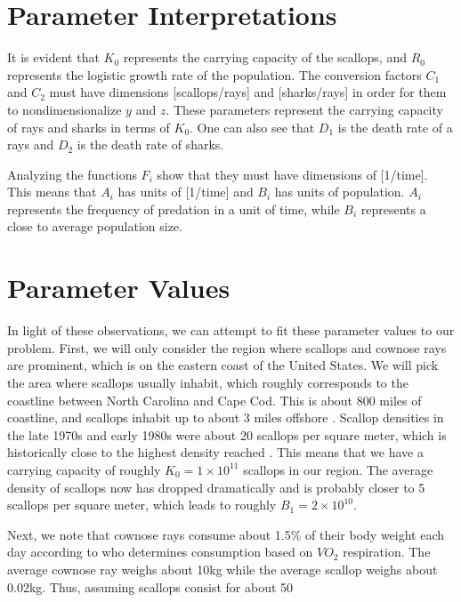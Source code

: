 \documentclass{article}
\begin{document}
\section{Parameter Interpretations}

It is evident that $K_0$ represents the carrying capacity of the scallops, and $R_0$ represents the logistic growth rate of the population. The conversion factors $C_1$ and $C_2$ must have dimensions [scallops/rays] and [sharks/rays] in order for them to nondimensionalize $y$ and $z$. These parameters represent the carrying capacity of rays and sharks in terms of $K_0$. One can also see that $D_1$ is the death rate of a rays and $D_2$ is the death rate of sharks. 

Analyzing the functions $F_i$ show that they must have dimensions of [1/time]. This means that $A_i$ has units of [1/time] and $B_i$ has units of population. $A_i$ represents the frequency of predation in a unit of time, while $B_i$ represents a close to average population size. 

\section{Parameter Values}

In light of these observations, we can attempt to fit these parameter values to our problem. First, we will only consider the region where scallops and cownose rays are prominent, which is on the eastern coast of the United States. We will pick the area where scallops usually inhabit, which roughly corresponds to the coastline between North Carolina and Cape Cod. This is about 800 miles of coastline, and scallops inhabit up to about 3 miles offshore \cite{Fay(1983)}. Scallop densities in the late 1970s and early 1980s were about 20 scallops per square meter, which is historically close to the highest density reached \cite{Fay(1983)}. This means that we have a carrying capacity of roughly $K_0 = 1 \times 10^{11}$ scallops in our region. The average density of scallops now has dropped dramatically and is probably closer to 5 scallops per square meter, which leads to roughly $B_1 = 2 \times 10^{10}$. 

Next, we note that cownose rays consume about 1.5\% of their body weight each day according to \cite{Neer(2005)} who determines consumption based on $VO_2$ respiration. The average cownose ray weighs about 10kg while the average scallop weighs about 0.02kg. Thus, assuming scallops consist for about 50%
\end{document}
